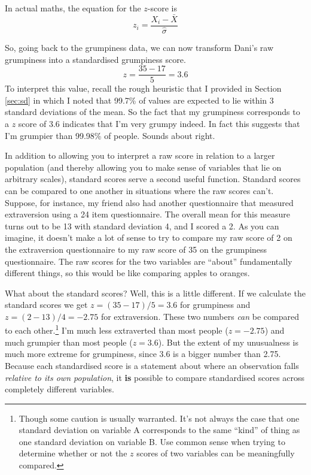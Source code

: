 \documentclass[
]{book}
\begin{document}
In actual maths, the equation for the \(z\)-score is
\[
z_i = \frac{X_i - \bar{X}}{\hat\sigma}
\]

So, going back to the grumpiness data, we can now transform Dani's raw grumpiness into a standardised grumpiness score.
\[
z = \frac{35 - 17}{5} = 3.6
\]
To interpret this value, recall the rough heuristic that I provided in Section \ref{sec:sd} in which I noted that 99.7\% of values are expected to lie within 3 standard deviations of the mean. So the fact that my grumpiness corresponds to a \(z\) score of 3.6 indicates that I'm very grumpy indeed. In fact this suggests that I'm grumpier than 99.98\% of people. Sounds about right.

In addition to allowing you to interpret a raw score in relation to a larger population (and thereby allowing you to make sense of variables that lie on arbitrary scales), standard scores serve a second useful function. Standard scores can be compared to one another in situations where the raw scores can't. Suppose, for instance, my friend also had another questionnaire that measured extraversion using a 24 item questionnaire. The overall mean for this measure turns out to be 13 with standard deviation 4, and I scored a 2. As you can imagine, it doesn't make a lot of sense to try to compare my raw score of 2 on the extraversion questionnaire to my raw score of 35 on the grumpiness questionnaire. The raw scores for the two variables are ``about'' fundamentally different things, so this would be like comparing apples to oranges.

What about the standard scores? Well, this is a little different. If we calculate the standard scores we get \(z = (35-17)/5 = 3.6\) for grumpiness and \(z = (2-13)/4 = -2.75\) for extraversion. These two numbers \emph{can} be compared to each other.\footnote{Though some caution is usually warranted. It's not always the case that one standard deviation on variable A corresponds to the same ``kind'' of thing as one standard deviation on variable B. Use common sense when trying to determine whether or not the \(z\) scores of two variables can be meaningfully compared.} I'm much less extraverted than most people (\(z = -2.75\)) and much grumpier than most people (\(z = 3.6\)). But the extent of my unusualness is much more extreme for grumpiness, since 3.6 is a bigger number than 2.75. Because each standardised score is a statement about where an observation falls \emph{relative to its own population}, it \textbf{is} possible to compare standardised scores across completely different variables.
\end{document}
